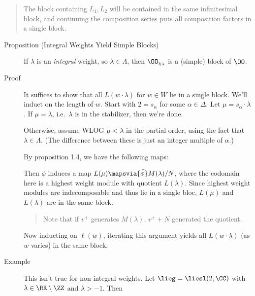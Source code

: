 \begin{quote}
The block containing \(L_1, L_2\) will be contained in the same
infinitesimal block, and continuing the composition series puts all
composition factors in a single block.
\end{quote}

\begin{description}
\item[Proposition (Integral Weights Yield Simple Blocks)]
If \(\lambda\) is an \emph{integral} weight, so \(\lambda \in \Lambda\),
then \(\OO_{\chi_\lambda}\) is a (simple) block of \(\OO\).
\item[Proof]
It suffices to show that all \(L(w\cdot \lambda)\) for \(w\in W\) lie in
a single block. We'll induct on the length of \(w\). Start with
\(2 = s_\alpha\) for some \(\alpha\in \Delta\). Let
\(\mu = s_\alpha \cdot \lambda\). If \(\mu = \lambda\), i.e.~\(\lambda\)
is in the stabilizer, then we're done.

Otherwise, assume WLOG \(\mu < \lambda\) in the partial order, using the
fact that \(\lambda \in \Lambda\). (The difference between these is just
an integer multiple of \(\alpha\).)

By proposition 1.4, we have the following maps:

\begin{center}
\end{center}

Then \(\phi\) induces a map \(L(\mu) \mapsvia{\bar \phi} M(\lambda)/N\),
where the codomain here is a highest weight module with quotient
\(L(\lambda)\). Since highest weight modules are indecomposable and thus
lie in a single bloc, \(L(\mu)\) and \(L(\lambda)\) are in the same
block.

\begin{quote}
Note that if \(v^+\) generates \(M(\lambda)\), \(v^+ + N\) generated the
quotient.
\end{quote}

Now inducting on \(\ell(w)\), iterating this argument yields all
\(L(w\cdot \lambda)\) (as \(w\) varies) in the same block.
\item[Example]
This isn't true for non-integral weights. Let \(\lieg = \liesl(2, \CC)\)
with \(\lambda \in \RR \setminus \ZZ\) and \(\lambda > -1\). Then


\end{description}
